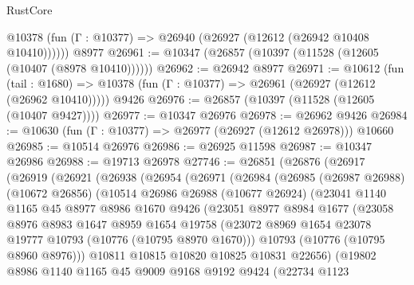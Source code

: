 \begin{lexlean}{RustCore}
\begin{coremodule}
      @10378 (fun (Γ : @10377) => @26940 (@26927 (@12612 (@26942 @10408 @10410))))))
    @8977
@26961 := @10347 (@26857 (@10397 (@11528 (@12605 (@10407 (@8978 @10410))))))
@26962 := @26942 @8977
@26971 := @10612
    (fun (tail : @1680) => @10378 (fun (Γ : @10377) => @26961 (@26927 (@12612 (@26962 @10410)))))
    @9426
@26976 := @26857 (@10397 (@11528 (@12605 (@10407 @9427))))
@26977 := @10347 @26976
@26978 := @26962 @9426
@26984 := @10630 (fun (Γ : @10377) => @26977 (@26927 (@12612 @26978))) @10660
@26985 := @10514 @26976
@26986 := @26925 @11598
@26987 := @10347 @26986
@26988 := @19713 @26978
@27746 := @26851
    (@26876
      (@26917
        (@26919
          (@26921
            (@26938
              (@26954
                (@26971
                  (@26984
                    (@26985
                      (@26987 @26988)
                      (@10672 @26856)
                      (@10514
                        @26986
                        @26988
                        (@10677 @26924)
                        (@23041
                          @1140
                          @1165
                          @45
                          @8977
                          @8986
                          @1670
                          @9426
                          (@23051
                            @8977
                            @8984
                            @1677
                            (@23058
                              @8976
                              @8983
                              @1647
                              @8959
                              @1654
                              @19758
                              (@23072
                                @8969
                                @1654
                                @23078
                                @19777
                                @10793
                                (@10776 (@10795 @8970 @1670)))
                              @10793
                              (@10776 (@10795 @8960 @8976)))
                            @10811
                            @10815
                            @10820
                            @10825
                            @10831
                            @22656)
                          (@19802
                            @8986
                            @1140
                            @1165
                            @45
                            @9009
                            @9168
                            @9192
                            @9424
                            (@22734
                              @1123

\end{coremodule}
\end{lexlean}
